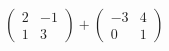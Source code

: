 \hspace*{2mm}\begin{minipage}[t]{\dimexpr\linewidth-2mm\relax}\vspace{0pt}
$\begin{pmatrix} 2 & -1 \\ 1 & 3 \end{pmatrix}+\begin{pmatrix} -3 & 4 \\ 0 & 1 \end{pmatrix}$\end{minipage}
